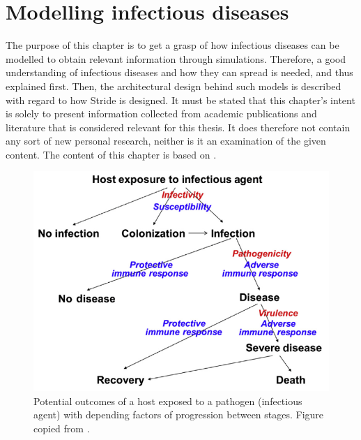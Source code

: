 
\chapter{Modelling infectious diseases}
\label{chapter:modelling_of_infectious_diseases}
The purpose of this chapter is to get a grasp of how infectious diseases can be modelled to obtain relevant information through simulations. Therefore, a good understanding of infectious diseases and how they can spread is needed, and thus explained first. Then, the architectural design behind such models is described with regard to how Stride is designed. It must be stated that this chapter's intent is solely to present information collected from academic publications and literature that is considered relevant for this thesis. It does therefore not contain any sort of new personal research, neither is it an examination of the given content. The content of this chapter is based on \cite{book:principles_infectious_diseases, book:transmission_principles, contact_tracing_and_disease_control, innate_immunity, acquired_immunity, types_of_immunity, acute_infections, sir_model_origin, book:modelling, usefulness_models, stochastic_modelling, compartmental_model, lander_lessons_decade, lander_phd, introduction_agent-based_models, abm_surging_tool, abm_methods_and_techniques, parameter_importance_bilcke, lander_estimating}.

\begin{figure}[ht]
    \centering
    \includegraphics[width=.5\textwidth]{2 - Modelling of infectious diseases/fig/infectious_disease_outcomes.png}
    \caption{Potential outcomes of a host exposed to a pathogen (infectious agent) with depending factors of progression between stages. Figure copied from \cite{book:principles_infectious_diseases}.}
    \label{fig:infectious_disease_outcomes}
\end{figure}

